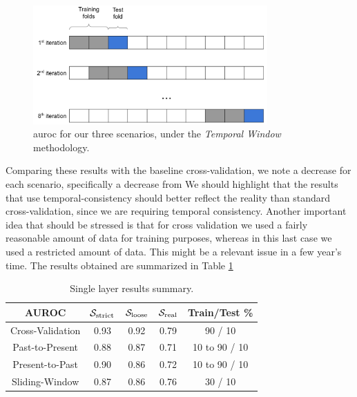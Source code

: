 \begin{figure}[!h]
	\centering
	\includegraphics[width=0.8\textwidth]{Figures/dia_slidingwindow.png}
	\caption[Single layer results for static features in \textit{Temporal Window}.]{\gls{auroc} for our three scenarios, under the \textit{Temporal Window} methodology.}
	\label{fig:slidingwindow}
\end{figure}

Comparing these results with the baseline cross-validation, we note a decrease for each scenario, specifically a decrease from 
We should highlight that the results that use temporal-consistency should better reflect the reality than standard cross-validation, since we are requiring temporal consistency.
Another important idea that should be stressed is that for cross validation we used a fairly reasonable amount of data for training purposes, whereas in this last case we used a restricted amount of data. This might be a relevant issue in a few year's time. The results obtained are summarized in Table \ref{tab:singlelayer_results}

\begin{table}[!htb]
	\renewcommand{\arraystretch}{1.2} %
	\centering
	\begin{tabular}{ccccc}
		\hline AUROC & $\mathcal{S}_{\mathrm{strict}}$ & $\mathcal{S}_{\mathrm{loose}}$ & $\mathcal{S}_{\mathrm{real}}$ & Train/Test \%\\
		\hline Cross-Validation & 0.93 & 0.92 & 0.79 & 90 / 10\\
		\hline Past-to-Present & 0.88 & 0.87 & 0.71 & 10 to 90 / 10\\
		\hline Present-to-Past & 0.90 & 0.86 & 0.72 & 10 to 90 / 10\\
		\hline Sliding-Window & 0.87 & 0.86 & 0.76 & 30 / 10\\
		\hline
	\end{tabular}
	\caption{Single layer results summary.}
	\label{tab:singlelayer_results}
\end{table}
